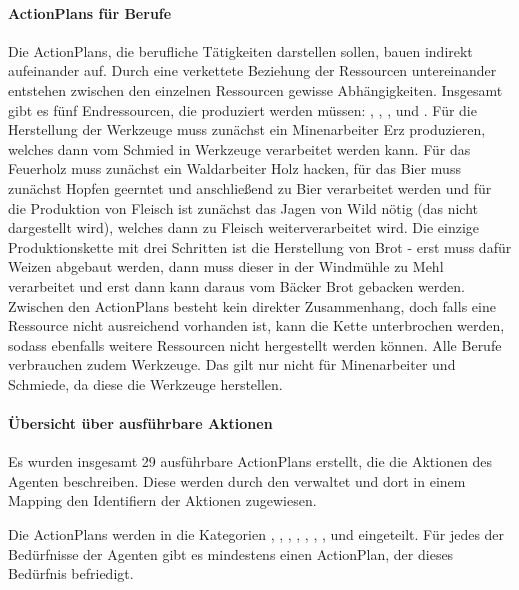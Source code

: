 \paragraph{ActionPlans für Berufe}
Die ActionPlans, die berufliche Tätigkeiten darstellen sollen, bauen indirekt aufeinander auf. Durch eine verkettete Beziehung der Ressourcen untereinander entstehen zwischen den einzelnen Ressourcen gewisse Abhängigkeiten. Insgesamt gibt es fünf Endressourcen, die produziert werden müssen: , , ,  und . Für die Herstellung der Werkzeuge muss zunächst ein Minenarbeiter Erz produzieren, welches dann vom Schmied in Werkzeuge verarbeitet werden kann. Für das Feuerholz muss zunächst ein Waldarbeiter Holz hacken, für das Bier muss zunächst Hopfen geerntet und anschließend zu Bier verarbeitet werden und für die Produktion von Fleisch ist zunächst das Jagen von Wild nötig (das nicht dargestellt wird), welches dann zu Fleisch weiterverarbeitet wird. Die einzige Produktionskette mit drei Schritten ist die Herstellung von Brot - erst muss dafür Weizen abgebaut werden, dann muss dieser in der Windmühle zu Mehl verarbeitet und erst dann kann daraus vom Bäcker Brot gebacken werden. Zwischen den ActionPlans besteht kein direkter Zusammenhang, doch falls eine Ressource nicht ausreichend vorhanden ist, kann die Kette unterbrochen werden, sodass ebenfalls weitere Ressourcen nicht hergestellt werden können.
Alle Berufe verbrauchen zudem Werkzeuge. Das gilt nur nicht für Minenarbeiter und Schmiede, da diese die Werkzeuge herstellen.






\paragraph{Übersicht über ausführbare Aktionen}
Es wurden insgesamt 29 ausführbare ActionPlans erstellt, die die Aktionen des Agenten beschreiben. Diese werden durch den  verwaltet und dort in einem Mapping den Identifiern der Aktionen zugewiesen.

Die ActionPlans werden in die Kategorien , , , , , , ,  und  eingeteilt. Für jedes der Bedürfnisse der Agenten gibt es mindestens einen ActionPlan, der dieses Bedürfnis befriedigt.

